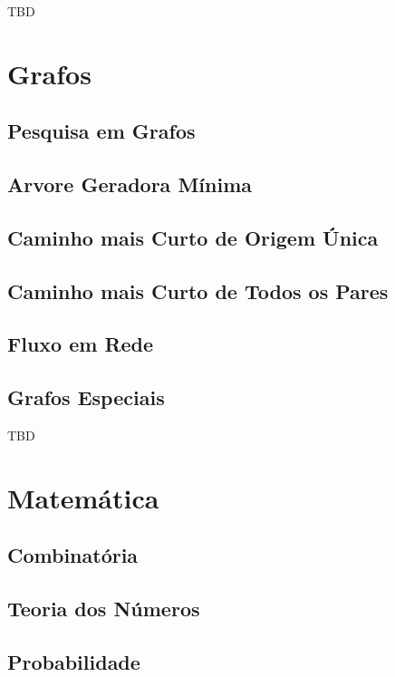 \documentclass[11pt]{scrartcl}
\begin{document}
TBD


\section{Grafos}

\subsection{Pesquisa em Grafos}

\subsection{Arvore Geradora Mínima}

\subsection{Caminho mais Curto de Origem Única}

\subsection{Caminho mais Curto de Todos os Pares}

\subsection{Fluxo em Rede}

\subsection{Grafos Especiais}

TBD


\section{Matemática}

\subsection{Combinatória}

\subsection{Teoria dos Números}

\subsection{Probabilidade}
\end{document}
